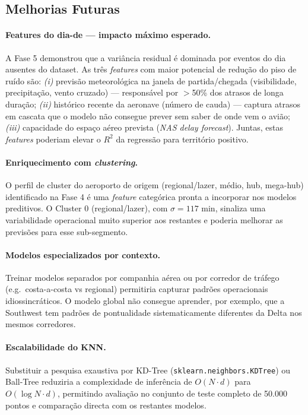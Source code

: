 \documentclass[conference]{IEEEtran}
\begin{document}
\subsection{Melhorias Futuras}

\paragraph{Features do dia-de — impacto máximo esperado.}
A Fase 5 demonstrou que a variância residual é dominada por eventos do dia
ausentes do dataset. As três \textit{features} com maior potencial de redução
do piso de ruído são:
\emph{(i)} previsão meteorológica na janela de partida/chegada (visibilidade,
precipitação, vento cruzado) — responsável por $>$50\% dos atrasos de longa
duração;
\emph{(ii)} histórico recente da aeronave (número de cauda) — captura atrasos
em cascata que o modelo não consegue prever sem saber de onde vem o avião;
\emph{(iii)} capacidade do espaço aéreo prevista (\textit{NAS delay forecast}).
Juntas, estas \textit{features} poderiam elevar o $R^2$ da regressão para
território positivo.

\paragraph{Enriquecimento com \textit{clustering}.}
O perfil de cluster do aeroporto de origem (regional/lazer, médio, hub,
mega-hub) identificado na Fase 4 é uma \textit{feature} categórica pronta a
incorporar nos modelos preditivos. O Cluster 0 (regional/lazer), com
$\sigma = 117$ min, sinaliza uma variabilidade operacional muito superior aos
restantes e poderia melhorar as previsões para esse sub-segmento.

\paragraph{Modelos especializados por contexto.}
Treinar modelos separados por companhia aérea ou por corredor de tráfego
(e.g.\ costa-a-costa vs regional) permitiria capturar padrões operacionais
idiossincráticos. O modelo global não consegue aprender, por exemplo, que a
Southwest tem padrões de pontualidade sistematicamente diferentes da Delta nos
mesmos corredores.

\paragraph{Escalabilidade do KNN.}
Substituir a pesquisa exaustiva por KD-Tree (\texttt{sklearn.neighbors.KDTree})
ou Ball-Tree reduziria a complexidade de inferência de $O(N \cdot d)$ para
$O(\log N \cdot d)$, permitindo avaliação no conjunto de teste completo de
50.000 pontos e comparação directa com os restantes modelos.
\end{document}
